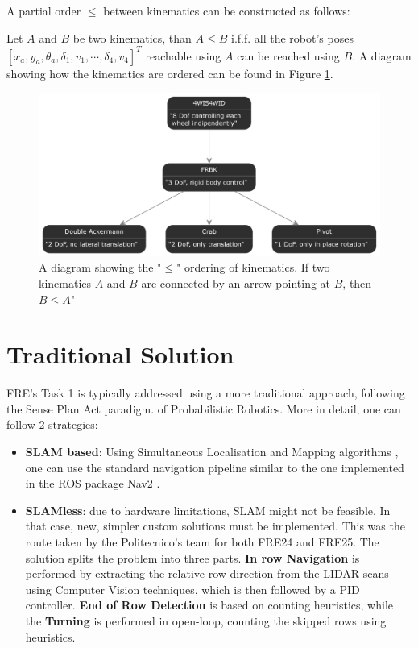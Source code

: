 \documentclass[11pt,a4paper,twocolumn]{article}
\begin{document}
A partial order $\leq$ between kinematics can be constructed as follows:

Let $A$ and $B$ be two kinematics, than $A \leq B$ i.f.f. all the robot's poses $[x_a, y_a, \theta_a, \delta_1, v_1, \cdots, \delta_4,v_4]^T$ reachable using $A$ can be reached using $B$. A diagram showing how the kinematics are ordered can be found in Figure \ref{fig:poset}.

\begin{figure}
    \centering
    \includegraphics[width=1\linewidth]{Multidisciplinary_Project_Report/Images/poset.png}
    \caption{A diagram showing the "$\leq$" ordering of kinematics. If two kinematics $A$ and $B$ are connected by an arrow pointing at $B$, then $B \leq A$"}
    \label{fig:poset}
\end{figure}

\section{Traditional Solution}
FRE's Task 1 is typically addressed using a more traditional approach, following the Sense Plan Act paradigm. of Probabilistic Robotics. More in detail, one can follow 2 strategies:
\begin{itemize}
    \item \textbf{SLAM based}: Using Simultaneous Localisation and Mapping algorithms \cite{DurrantWhyte2006SimultaneousLA} \cite{ProbabilisticRobotics}, one can use the standard navigation pipeline similar to the one implemented in the ROS package Nav2 \cite{nav2}.
    \item \textbf{SLAMless}: due to hardware limitations, SLAM might not be feasible. In that case, new, simpler custom solutions must be implemented. This was the route taken by the Politecnico's team for both FRE24 and FRE25. The solution splits the problem into three parts. \textbf{In row Navigation} is performed by extracting the relative row direction from the LIDAR scans using Computer Vision techniques, which is then followed by a PID controller. \textbf{End of Row Detection} is based on counting heuristics, while the \textbf{Turning} is performed in open-loop, counting the skipped rows using heuristics. 
\end{itemize}
\end{document}

